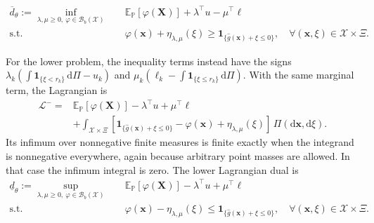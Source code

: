 \begin{equation}
  \begin{aligned}
    \overline d_\theta:=\inf_{\lambda,\mu\ge0,\ \varphi\in\mathcal B_b(\mathcal X)}\quad&
    \mathbb E_{\mathbb P}\left[\varphi(\bm X)\right]+\lambda^\top u-\mu^\top\ell\\
    \text{s.t.}\quad&
    \varphi(\bm x)+\eta_{\lambda,\mu}(\xi)
    \ge\mathbf1_{\{\hat g(\bm x)+\xi\le0\}},
    \quad\forall(\bm x,\xi)\in\mathcal X\times\Xi.
  \end{aligned}
  \label{eq-upper-measure-dual}
\end{equation}

For the lower problem, the inequality terms instead have the signs
$\lambda_k(\int\mathbf1_{\{\xi<r_k\}}\,\mathrm d\Pi-u_k)$ and
$\mu_k(\ell_k-\int\mathbf1_{\{\xi\le r_k\}}\,\mathrm d\Pi)$.
With the same marginal term, the Lagrangian is
\begin{equation}
  \begin{aligned}
    \mathcal L^-={}&\mathbb E_{\mathbb P}\left[\varphi(\bm X)\right]
    -\lambda^\top u+\mu^\top\ell\\
    &+\int_{\mathcal X\times\Xi}
    \left[\mathbf1_{\{\hat g(\bm x)+\xi\le0\}}-\varphi(\bm x)
    +\eta_{\lambda,\mu}(\xi)\right]\,\Pi\left(\mathrm d\bm x,\mathrm d\xi\right).
  \end{aligned}
  \label{eq-lower-lagrangian}
\end{equation}
Its infimum over nonnegative finite measures is finite exactly when the integrand is nonnegative everywhere, again because arbitrary point masses are allowed. In that case the infimum integral is zero. The lower Lagrangian dual is
\begin{equation}
  \begin{aligned}
    \underline d_\theta:=\sup_{\lambda,\mu\ge0,\ \varphi\in\mathcal B_b(\mathcal X)}\quad&
    \mathbb E_{\mathbb P}\left[\varphi(\bm X)\right]-\lambda^\top u+\mu^\top\ell\\
    \text{s.t.}\quad&
    \varphi(\bm x)-\eta_{\lambda,\mu}(\xi)
    \le\mathbf1_{\{\hat g(\bm x)+\xi\le0\}},
    \quad\forall(\bm x,\xi)\in\mathcal X\times\Xi.
  \end{aligned}
  \label{eq-lower-measure-dual}
\end{equation}

